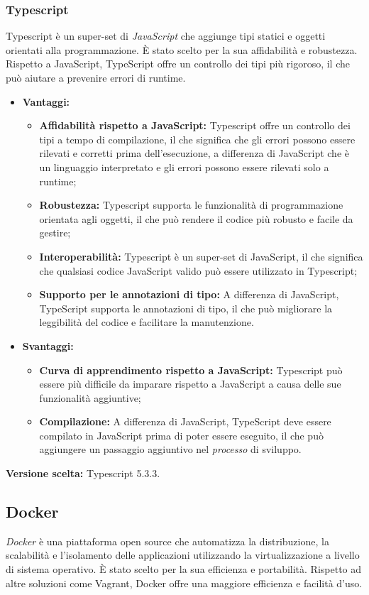 \documentclass[10pt, a4paper]{article}
\begin{document}
\subsubsection{Typescript}
Typescript è un super-set di \textit{JavaScript\pg} che aggiunge tipi statici e oggetti orientati alla programmazione. È stato scelto per la sua affidabilità e robustezza. Rispetto a JavaScript, TypeScript offre un controllo dei tipi più rigoroso, il che può aiutare a prevenire errori di runtime.

\begin{itemize}
\item \textbf{Vantaggi:}
\begin{itemize}
\item \textbf{Affidabilità rispetto a JavaScript:} Typescript offre un controllo dei tipi a tempo di compilazione, il che significa che gli errori possono essere rilevati e corretti prima dell'esecuzione, a differenza di JavaScript che è un linguaggio interpretato e gli errori possono essere rilevati solo a runtime;
\item \textbf{Robustezza:} Typescript supporta le funzionalità di programmazione orientata agli oggetti, il che può rendere il codice più robusto e facile da gestire;
\item \textbf{Interoperabilità:} Typescript è un super-set di JavaScript, il che significa che qualsiasi codice JavaScript valido può essere utilizzato in Typescript;
\item \textbf{Supporto per le annotazioni di tipo:} A differenza di JavaScript, TypeScript supporta le annotazioni di tipo, il che può migliorare la leggibilità del codice e facilitare la manutenzione.
\end{itemize}
\item \textbf{Svantaggi:}
\begin{itemize}
\item \textbf{Curva di apprendimento rispetto a JavaScript:} Typescript può essere più difficile da imparare rispetto a JavaScript a causa delle sue funzionalità aggiuntive;
\item \textbf{Compilazione:} A differenza di JavaScript, TypeScript deve essere compilato in JavaScript prima di poter essere eseguito, il che può aggiungere un passaggio aggiuntivo nel \textit{processo\pg} di sviluppo.
\end{itemize}
\end{itemize}
\textbf{Versione scelta:} Typescript 5.3.3.

\subsection{Docker}
\textit{Docker\pg} è una piattaforma open source che automatizza la distribuzione, la scalabilità e l'isolamento delle applicazioni utilizzando la virtualizzazione a livello di sistema operativo. È stato scelto per la sua efficienza e portabilità. Rispetto ad altre soluzioni come Vagrant, Docker offre una maggiore efficienza e facilità d'uso.
\end{document}
